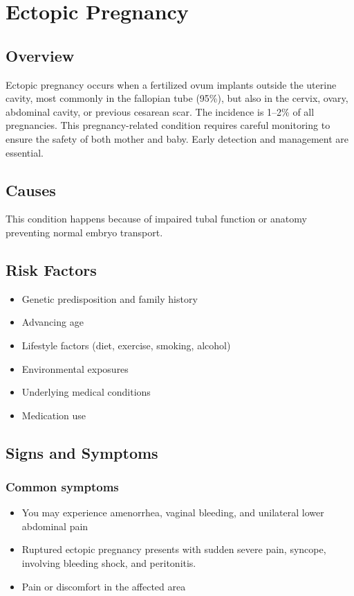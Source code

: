 \chapter{Ectopic Pregnancy}
\label{sec:Ectopic Pregnancy}

\section{Overview}
Ectopic pregnancy occurs when a fertilized ovum implants outside the uterine cavity, most commonly in the fallopian tube (95\%), but also in the cervix, ovary, abdominal cavity, or previous cesarean scar. The incidence is 1--2\% of all pregnancies. This pregnancy-related condition requires careful monitoring to ensure the safety of both mother and baby. Early detection and management are essential.
\section{Causes}
This condition happens because of impaired tubal function or anatomy preventing normal embryo transport.     
\section{Risk Factors}

\begin{itemize}[noitemsep]
  \item Genetic predisposition and family history
  \item Advancing age
  \item Lifestyle factors (diet, exercise, smoking, alcohol)
  \item Environmental exposures
  \item Underlying medical conditions
  \item Medication use
\end{itemize}
\section{Signs and Symptoms}

\subsection{Common symptoms}
\begin{itemize}[noitemsep]
  \item You may experience amenorrhea, vaginal bleeding, and unilateral lower abdominal pain
  \item Ruptured ectopic pregnancy presents with sudden severe pain, syncope, involving bleeding shock, and peritonitis.
  \item Pain or discomfort in the affected area
  \end{itemize}

